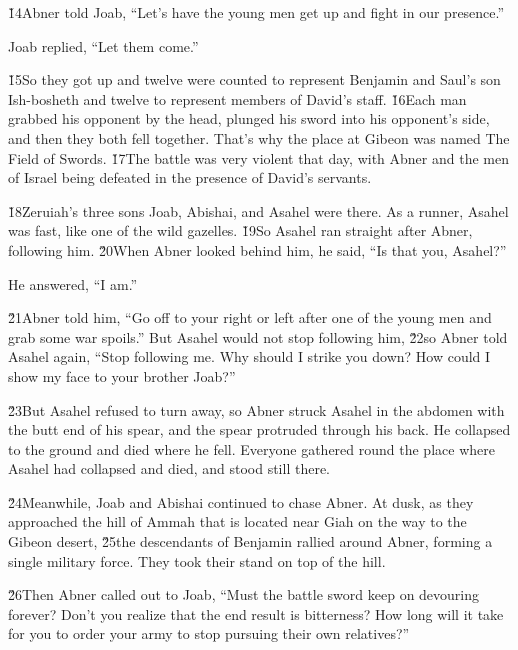 \v{14}Abner told Joab, ``Let's have the young men get up and fight in our presence.''

Joab replied, ``Let them come.''

\v{15}So they got up and twelve were counted to represent Benjamin and Saul's son Ish-bosheth and twelve to represent members of David's staff. \v{16}Each man grabbed his opponent by the head, plunged his sword into his opponent's side, and then they both fell together. That's why the place at Gibeon was named The Field of Swords. \v{17}The battle was very violent that day, with Abner and the men of Israel being defeated in the presence of David's servants.

\v{18}Zeruiah's three sons Joab, Abishai, and Asahel were there. As a runner, Asahel was fast, like one of the wild gazelles. \v{19}So Asahel ran straight after Abner, following him. \v{20}When Abner looked behind him, he said, ``Is that you, Asahel?''

He answered, ``I am.''

\v{21}Abner told him, ``Go off to your right or left after one of the young men and grab some war spoils.'' But Asahel would not stop following him, \v{22}so Abner told Asahel again, ``Stop following me. Why should I strike you down? How could I show my face to your brother Joab?''

\v{23}But Asahel refused to turn away, so Abner struck Asahel in the abdomen with the butt end of his spear, and the spear protruded through his back. He collapsed to the ground and died where he fell. Everyone gathered round the place where Asahel had collapsed and died, and stood still there.

\v{24}Meanwhile, Joab and Abishai continued to chase Abner. At dusk, as they approached the hill of Ammah that is located near Giah on the way to the Gibeon desert, \v{25}the descendants of Benjamin rallied around Abner, forming a single military force. They took their stand on top of the hill.

\v{26}Then Abner called out to Joab, ``Must the battle sword keep on devouring forever? Don't you realize that the end result is bitterness? How long will it take for you to order your army to stop pursuing their own relatives?''

